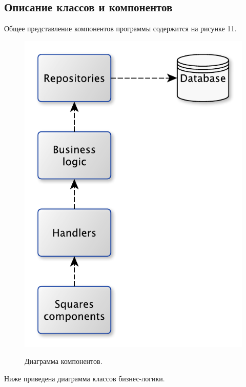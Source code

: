 \documentclass[a4paper,14pt]{extarticle}
\begin{document}
 	\subsection{Описание классов и компонентов}
 	
 	Общее представление компонентов программы содержится на рисунке 11.
 	
 	\newpage
 	
 	\begin{figure}[h!]
 		\begin{center}
 			{\includegraphics[scale = 0.6]{img/theme.pdf}}
 			\label{ris:theme}
 		\end{center}
 		\caption{Диаграмма компонентов.}
 	\end{figure}
 	
 	Ниже приведена диаграмма классов бизнес-логики.
 	
\end{document}
